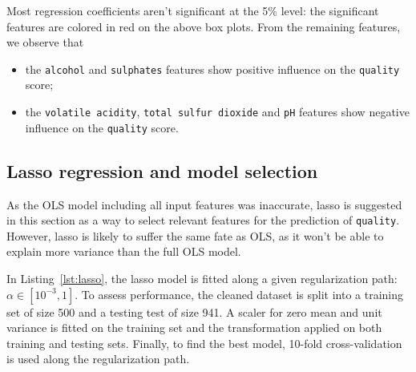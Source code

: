 \documentclass[12pt]{article}
\begin{document}
  Most regression coefficients aren't significant at the 5\% level: the
  significant features are colored in red on the above box plots. From the
  remaining features, we observe that
  \begin{itemize}
    \item the \lstinline{alcohol} and \lstinline{sulphates} features show
      positive influence on the \lstinline{quality} score;
    \item the \lstinline{volatile acidity}, \lstinline{total sulfur dioxide}
      and \lstinline{pH} features show negative influence on the
      \lstinline{quality} score.
  \end{itemize}

  \subsection{Lasso regression and model selection}

  As the OLS model including all input features was inaccurate, lasso is
  suggested in this section as a way to select relevant features for the
  prediction of \lstinline{quality}. However, lasso is likely to suffer the
  same fate as OLS, as it won't be able to explain more variance than the full
  OLS model.

  In Listing~\ref{lst:lasso}, the lasso model is fitted along a given
  regularization path: $\alpha\in[10^{-3}, 1]$. To assess performance, the
  cleaned dataset is split into a training set of size 500 and a testing
  test of size 941. A scaler for zero mean and unit variance is fitted on the
  training set and the transformation applied on both training and testing
  sets. Finally, to find the best model, 10-fold cross-validation is used along
  the regularization path.
\end{document}
